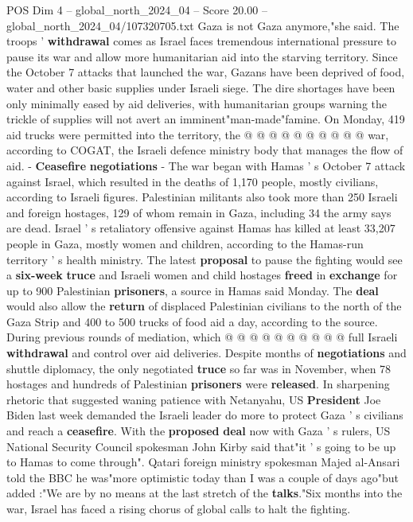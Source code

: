 \begin{textsample}{POS Dim 4 – global\_north\_2024\_04 – Score 20.00 – global\_north\_2024\_04/107320705.txt}
Gaza is not Gaza anymore,"she said.
The troops ' \textbf{withdrawal} comes as Israel faces tremendous international pressure to pause its war and allow more humanitarian aid into the starving territory.
Since the October 7 attacks that launched the war, Gazans have been deprived of food, water and other basic supplies under Israeli siege.
The dire shortages have been only minimally eased by aid deliveries, with humanitarian groups warning the trickle of supplies will not avert an imminent"man-made"famine.
On Monday, 419 aid trucks were permitted into the territory, the @ @ @ @ @ @ @ @ @ @ war, according to COGAT, the Israeli defence ministry body that manages the flow of aid. - \textbf{Ceasefire} \textbf{negotiations} - The war began with Hamas ' s October 7 attack against Israel, which resulted in the deaths of 1,170 people, mostly civilians, according to Israeli figures.
Palestinian militants also took more than 250 Israeli and foreign hostages, 129 of whom remain in Gaza, including 34 the army says are dead.
Israel ' s retaliatory offensive against Hamas has killed at least 33,207 people in Gaza, mostly women and children, according to the Hamas-run territory ' s health ministry.
The latest \textbf{proposal} to pause the fighting would see a \textbf{six-week} \textbf{truce} and Israeli women and child hostages \textbf{freed} in \textbf{exchange} for up to 900 Palestinian \textbf{prisoners}, a source in Hamas said Monday.
The \textbf{deal} would also allow the \textbf{return} of displaced Palestinian civilians to the north of the Gaza Strip and 400 to 500 trucks of food aid a day, according to the source.
During previous rounds of mediation, which @ @ @ @ @ @ @ @ @ @ full Israeli \textbf{withdrawal} and control over aid deliveries.
Despite months of \textbf{negotiations} and shuttle diplomacy, the only negotiated \textbf{truce} so far was in November, when 78 hostages and hundreds of Palestinian \textbf{prisoners} were \textbf{released}.
In sharpening rhetoric that suggested waning patience with Netanyahu, US \textbf{President} Joe Biden last week demanded the Israeli leader do more to protect Gaza ' s civilians and reach a \textbf{ceasefire}.
With the \textbf{proposed} \textbf{deal} now with Gaza ' s rulers, US National Security Council spokesman John Kirby said that"it ' s going to be up to Hamas to come through".
Qatari foreign ministry spokesman Majed al-Ansari told the BBC he was"more optimistic today than I was a couple of days ago"but added :"We are by no means at the last stretch of the \textbf{talks}."Six months into the war, Israel has faced a rising chorus of global calls to halt the fighting.

\end{textsample}
